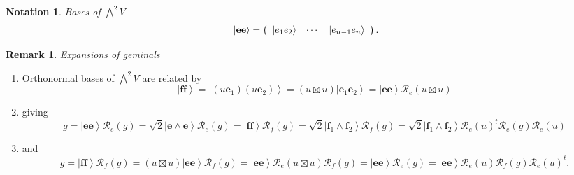\documentclass[aps,preprint]{revtex4}%
\newtheorem{notation}[theorem]{Notation}
\newtheorem{remark}[theorem]{Remark}
\begin{document}
\begin{notation}
Bases of $%
{\textstyle\bigwedge\nolimits^{2}}
V$%
\begin{equation}
\left\vert \mathbf{ee}\right\rangle =\left(
\begin{array}
[c]{ccc}%
\left\vert e_{1}e_{2}\right\rangle  & \cdots & \left\vert e_{n-1}%
e_{n}\right\rangle
\end{array}
\right)  .
\end{equation}

\end{notation}

\begin{remark}
Expansions of geminals
\end{remark}

\begin{enumerate}
\item Orthonormal bases of $%
{\textstyle\bigwedge\nolimits^{2}}
V$ are related by
\begin{equation}
\left\vert \mathbf{ff}\right\rangle =\left\vert \left(  u\mathbf{e}%
_{1}\right)  \left(  u\mathbf{e}_{2}\right)  \right\rangle =\left(  u\boxtimes
u\right)  \left\vert \mathbf{e}_{1}\mathbf{e}_{2}\right\rangle =\left\vert
\mathbf{ee}\right\rangle \mathcal{R}_{e}\left(  u\boxtimes u\right)
\end{equation}


\item giving%
\begin{equation}
g=\left\vert \mathbf{ee}\right\rangle \mathcal{R}_{e}\left(  g\right)
=\sqrt{2}\left\vert \mathbf{e}\wedge\mathbf{e}\right\rangle \mathcal{R}%
_{e}\left(  g\right)  =\left\vert \mathbf{ff}\right\rangle \mathcal{R}%
_{f}\left(  g\right)  =\sqrt{2}\left\vert \mathbf{f}_{1}\wedge\mathbf{f}%
_{2}\right\rangle \mathcal{R}_{f}\left(  g\right)  =\sqrt{2}\left\vert
\mathbf{f}_{1}\wedge\mathbf{f}_{2}\right\rangle \mathcal{R}_{e}\left(
u\right)  ^{t}\mathcal{R}_{e}\left(  g\right)  \mathcal{R}_{e}\left(
u\right)
\end{equation}


\item and%
\begin{equation}
g=\left\vert \mathbf{ff}\right\rangle \mathcal{R}_{f}\left(  g\right)
=\left(  u\boxtimes u\right)  \left\vert \mathbf{ee}\right\rangle
\mathcal{R}_{f}\left(  g\right)  =\left\vert \mathbf{ee}\right\rangle
\mathcal{R}_{e}\left(  u\boxtimes u\right)  \mathcal{R}_{f}\left(  g\right)
=\left\vert \mathbf{ee}\right\rangle \mathcal{R}_{e}\left(  g\right)
=\left\vert \mathbf{ee}\right\rangle \mathcal{R}_{e}\left(  u\right)
\mathcal{R}_{f}\left(  g\right)  \mathcal{R}_{e}\left(  u\right)  ^{t}.
\end{equation}



\end{enumerate}
\end{document}
